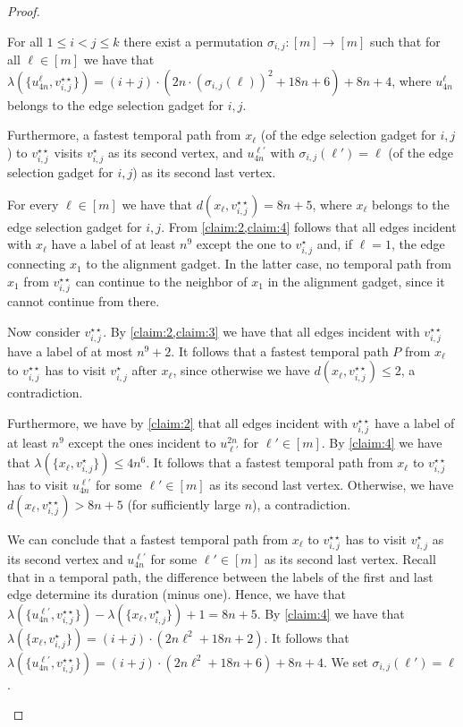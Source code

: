 \documentclass[a4paper,UKenglish,cleveref, autoref, thm-restate]{lipics-v2021}
\begin{document}
\begin{proof}
\begin{claim}\label{claim:5}
    For all $1\le i<j\le k$ there exist a permutation $\sigma_{i,j}:[m]\rightarrow [m]$ such that for all $\ell\in[m]$ we have that $\lambda(\{u^\ell_{4n},v_{i,j}^{\star\star}\})=(i+j)\cdot (2n\cdot (\sigma_{i,j}(\ell))^2 +18n+6)+8n+4$, where $u^\ell_{4n}$ belongs to the edge selection gadget for $i,j$.

    Furthermore, a fastest temporal path from $x_\ell$ (of the edge selection gadget for $i,j$) to $v_{i,j}^{\star\star}$ visits $v_{i,j}^\star$ as its second vertex, and $u^{\ell'}_{4n}$ with $\sigma_{i,j}(\ell')=\ell$ (of the edge selection gadget for $i,j$) as its second last vertex.
\end{claim}
\begin{claimproof}
    For every $\ell\in[m]$ we have that $d(x_\ell,v_{i,j}^{\star\star})=8n+5$, where $x_\ell$ belongs to the edge selection gadget for $i,j$. From \cref{claim:2,claim:4} follows that all edges incident with $x_\ell$ have a label of at least $n^9$ except the one to $v_{i,j}^\star$ and, if $\ell=1$, the edge connecting $x_1$ to the alignment gadget. In the latter case, no temporal path from $x_1$ from $v_{i,j}^{\star\star}$ can continue to the neighbor of $x_1$ in the alignment gadget, since it cannot continue from there.

    Now consider $v_{i,j}^{\star\star}$. By \cref{claim:2,claim:3} we have that all edges incident with $v_{i,j}^{\star\star}$ have a label of at most $n^9+2$. It follows that a fastest temporal path $P$ from $x_\ell$ to $v_{i,j}^{\star\star}$ has to visit $v_{i,j}^\star$ after $x_\ell$, since otherwise we have $d(x_\ell,v_{i,j}^{\star\star})\le 2$, a contradiction.

    Furthermore, we have by \cref{claim:2} that all edges incident with $v_{i,j}^{\star\star}$ have a label of at least $n^9$ except the ones incident to $u_{\ell'}^{2n}$ for $\ell'\in[m]$. By \cref{claim:4} we have that $\lambda(\{x_\ell,v_{i,j}^{\star}\})\le 4n^6$.
    It follows that a fastest temporal path from $x_\ell$ to $v_{i,j}^{\star\star}$ has to visit $u^{\ell'}_{4n}$ for some $\ell'\in[m]$ as its second last vertex. Otherwise, we have $d(x_\ell,v_{i,j}^{\star\star})> 8n+5$ (for sufficiently large $n$), a contradiction.

    We can conclude that a fastest temporal path from $x_\ell$ to $v_{i,j}^{\star\star}$ has to visit $v_{i,j}^\star$ as its second vertex and $u^{\ell'}_{4n}$ for some $\ell'\in[m]$ as its second last vertex. Recall that in a  temporal path, the difference between the labels of the first and last edge determine its duration (minus one). Hence, we have that $\lambda(\{u^{\ell'}_{4n},v_{i,j}^{\star\star}\})-\lambda(\{x_\ell,v_{i,j}^{\star}\})+1=8n+5$.
    By \cref{claim:4} we have that $\lambda(\{x_\ell,v_{i,j}^{\star}\})=(i+j)\cdot (2n\ell^2+18n +2)$. It follows that $\lambda(\{u^{\ell'}_{4n},v_{i,j}^{\star\star}\})=(i+j)\cdot (2n\ell^2 +18n+6)+8n+4$. We set $\sigma_{i,j}(\ell')=\ell$.


\end{claimproof}
\end{proof}
\end{document}
